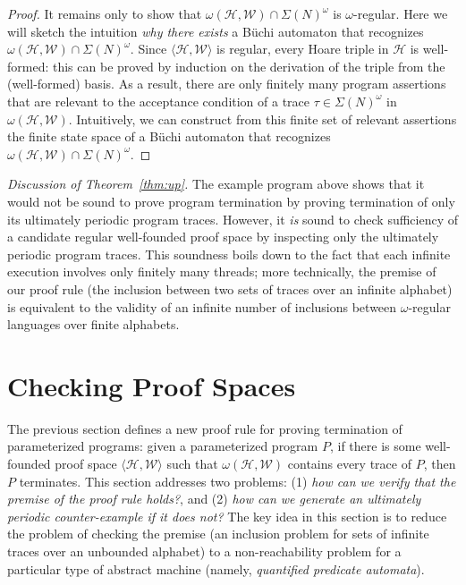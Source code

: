 \documentclass[9pt,nocopyrightspace]{sigplanconf}
\theoremstyle{definition}
\newcommand{\tuple}[1]{\langle #1 \rangle}
\newcommand{\rankformulas}{\mathscr{W}}
\newcommand{\itrace}{infinite trace}
\newcommand{\iSigma}[1]{\Sigma(#1)}
\begin{document}
\begin{proof}
  It remains only to show that $\omega(\mathscr{H},\rankformulas) \cap \iSigma{N}^\omega$
  is $\omega$-regular.  Here we will sketch the intuition \emph{why there
    exists} a B\"{u}chi automaton that recognizes $\omega(\mathscr{H},\rankformulas)
  \cap \iSigma{N}^\omega$.  Since $\tuple{\mathscr{H},\mathscr{W}}$ is regular, every
  Hoare triple in $\mathscr{H}$ is well-formed: this can be proved by
  induction on the derivation of the triple from the (well-formed) basis.  As a result, there
  are only finitely many program assertions that are relevant to the
  acceptance condition of a trace $\tau \in \iSigma{N}^\omega$ in
  $\omega(\mathscr{H},\rankformulas)$.  Intuitively, we can construct from this finite set
  of relevant assertions the finite state space of a B\"{u}chi automaton
  that recognizes $\omega(\mathscr{H},\rankformulas) \cap \iSigma{N}^\omega$.
\end{proof}

\textit{Discussion of Theorem~\ref{thm:up}.}
The example program above shows that it would not be sound to prove program
termination by proving termination of only its ultimately periodic program
traces.  However, it \emph{is} sound to check sufficiency of a candidate
regular well-founded proof space by inspecting only the ultimately periodic
program traces.  This soundness boils down to the fact that each infinite
execution involves only finitely many threads; more technically, the premise
of our proof rule (the inclusion between two sets of traces over an infinite
alphabet) is equivalent to the validity of an infinite number of inclusions
between $\omega$-regular languages over finite alphabets.

\section{Checking Proof Spaces} \label{sec:check}

The previous section defines a new proof rule for proving termination of
parameterized programs: given a parameterized program $P$, if there is some
well-founded proof space $\tuple{\mathscr{H},\rankformulas}$ such that
$\omega(\mathscr{H},\rankformulas)$ contains every trace of $P$, then $P$ terminates.
This section addresses two problems: (1) \emph{how can we verify that the
  premise of the proof rule holds?}, and (2) \emph{how can we generate an 
  ultimately periodic counter-example if it does not?}  The key idea in this section
is to reduce the problem of checking the premise (an inclusion problem for
sets of \itrace{}s over an unbounded alphabet) to a non-reachability
problem for a particular type of abstract machine (namely, \emph{quantified predicate automata}).
\end{document}
